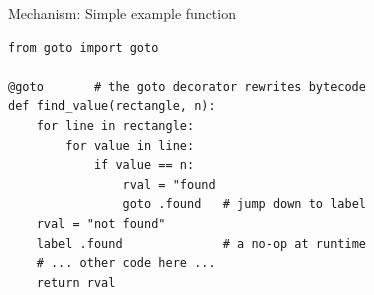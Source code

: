 \documentclass{beamer}
\begin{document}
\begin{frame}[fragile]{Mechanism: Simple example function}



\begin{verbatim}
from goto import goto

@goto       # the goto decorator rewrites bytecode
def find_value(rectangle, n):
    for line in rectangle:
        for value in line:
            if value == n:
                rval = "found
                goto .found   # jump down to label
    rval = "not found"
    label .found              # a no-op at runtime
    # ... other code here ...
    return rval
\end{verbatim}

%

\end{frame}
%
\end{document}
